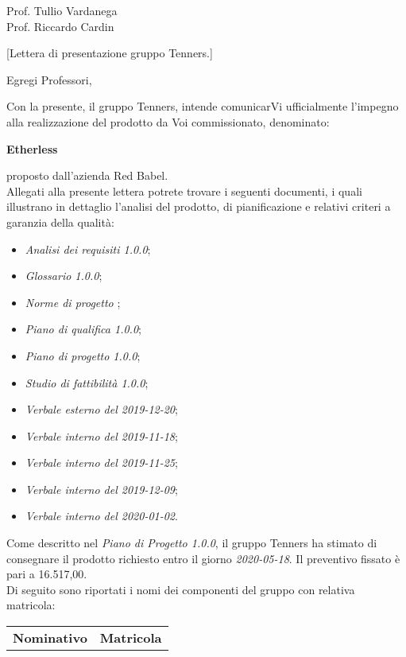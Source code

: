 \begin{letter}{\begin{flushright}
			Prof. Tullio Vardanega \\
			Prof. Riccardo Cardin 
	\end{flushright}}[Lettera di presentazione gruppo Tenners.]
\opening[Padova, ]{Egregi Professori,}
	\noindent Con la presente, il gruppo Tenners, intende comunicarVi ufficialmente l'impegno alla realizzazione del prodotto da Voi commissionato, denominato:
	\begin{center}
		\textbf{Etherless}
	\end{center}
    proposto dall'azienda Red Babel. \\
    \noindent Allegati alla presente lettera potrete trovare i seguenti documenti, i quali illustrano in dettaglio l'analisi del prodotto, di pianificazione e relativi criteri a garanzia della qualità:
    \begin{itemize}
    	\item \textit{Analisi dei requisiti 1.0.0};
    	\item \textit{Glossario 1.0.0};
    	\item \textit{Norme di progetto };%
    	\item \textit{Piano di qualifica 1.0.0};
    	\item \textit{Piano di progetto 1.0.0};
    	\item \textit{Studio di fattibilità 1.0.0};
    	\item \textit{Verbale esterno del 2019-12-20};
    	\item \textit{Verbale interno del 2019-11-18};
    	\item \textit{Verbale interno del 2019-11-25};
    	\item \textit{Verbale interno del 2019-12-09};
    	\item \textit{Verbale interno del 2020-01-02}.
    \end{itemize}
    Come descritto nel \textit{Piano di Progetto 1.0.0}\docs, il gruppo Tenners ha stimato di consegnare il prodotto richiesto entro il giorno \textit{2020-05-18}. Il preventivo fissato è pari a 16.517,00\officialeuro.\\ 
    \noindent Di seguito sono riportati i nomi dei componenti del gruppo con relativa matricola:
    \begin{center}
        \begin{tabular}{c c}
        	\rowcolor{header}
    	    \textbf{Nominativo} & \textbf{Matricola} \\

\end{tabular}
\end{center}
\end{letter}
